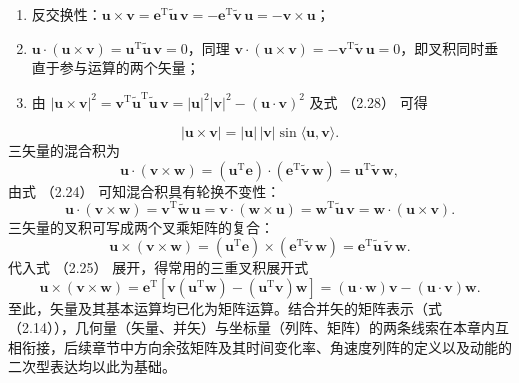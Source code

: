 \begin{enumerate}

\item 反交换性：$\boldsymbol{u}\times\boldsymbol{v} = \boldsymbol{e}^{\mathrm{T}}\tilde{\boldsymbol{u}}\,\boldsymbol{v} = -\boldsymbol{e}^{\mathrm{T}}\tilde{\boldsymbol{v}}\,\boldsymbol{u} = -\boldsymbol{v}\times\boldsymbol{u}$；

\item $\boldsymbol{u}\cdot\left(\boldsymbol{u}\times\boldsymbol{v}\right) = \boldsymbol{u}^{\mathrm{T}}\tilde{\boldsymbol{u}}\,\boldsymbol{v} = 0$，同理 $\boldsymbol{v}\cdot\left(\boldsymbol{u}\times\boldsymbol{v}\right) = -\boldsymbol{v}^{\mathrm{T}}\tilde{\boldsymbol{v}}\,\boldsymbol{u} = 0$，即叉积同时垂直于参与运算的两个矢量；

\item 由 $|\boldsymbol{u}\times\boldsymbol{v}|^2 = \boldsymbol{v}^{\mathrm{T}}\tilde{\boldsymbol{u}}^{\mathrm{T}}\tilde{\boldsymbol{u}}\,\boldsymbol{v} = |\boldsymbol{u}|^2|\boldsymbol{v}|^2 - (\boldsymbol{u}\cdot\boldsymbol{v})^2$ 及式 （2.28） 可得

\end{enumerate}
\[
|\boldsymbol{u}\times\boldsymbol{v}| = |\boldsymbol{u}|\,|\boldsymbol{v}|\sin\langle\boldsymbol{u},\boldsymbol{v}\rangle.
\]
三矢量的混合积为
\[
\boldsymbol{u}\cdot\left(\boldsymbol{v}\times\boldsymbol{w}\right)
= \left(\boldsymbol{u}^{\mathrm{T}}\boldsymbol{e}\right)\cdot\left(\boldsymbol{e}^{\mathrm{T}}\tilde{\boldsymbol{v}}\,\boldsymbol{w}\right)
= \boldsymbol{u}^{\mathrm{T}}\tilde{\boldsymbol{v}}\,\boldsymbol{w},
\]
由式 （2.24） 可知混合积具有轮换不变性：
\[
\boldsymbol{u}\cdot\left(\boldsymbol{v}\times\boldsymbol{w}\right)
= \boldsymbol{v}^{\mathrm{T}}\tilde{\boldsymbol{w}}\,\boldsymbol{u} = \boldsymbol{v}\cdot\left(\boldsymbol{w}\times\boldsymbol{u}\right)
= \boldsymbol{w}^{\mathrm{T}}\tilde{\boldsymbol{u}}\,\boldsymbol{v} = \boldsymbol{w}\cdot\left(\boldsymbol{u}\times\boldsymbol{v}\right).
\]
三矢量的叉积可写成两个叉乘矩阵的复合：
\[
\boldsymbol{u}\times\left(\boldsymbol{v}\times\boldsymbol{w}\right)
= \left(\boldsymbol{u}^{\mathrm{T}}\boldsymbol{e}\right)\times\left(\boldsymbol{e}^{\mathrm{T}}\tilde{\boldsymbol{v}}\,\boldsymbol{w}\right)
= \boldsymbol{e}^{\mathrm{T}}\tilde{\boldsymbol{u}}\,\tilde{\boldsymbol{v}}\,\boldsymbol{w}.
\]
代入式 （2.25） 展开，得常用的三重叉积展开式
\[
\boldsymbol{u}\times\left(\boldsymbol{v}\times\boldsymbol{w}\right)
= \boldsymbol{e}^{\mathrm{T}}\left[\boldsymbol{v}\left(\boldsymbol{u}^{\mathrm{T}}\boldsymbol{w}\right) - \left(\boldsymbol{u}^{\mathrm{T}}\boldsymbol{v}\right)\boldsymbol{w}\right]
= \left(\boldsymbol{u}\cdot\boldsymbol{w}\right)\boldsymbol{v} - \left(\boldsymbol{u}\cdot\boldsymbol{v}\right)\boldsymbol{w}.
\]
至此，矢量及其基本运算均已化为矩阵运算。结合并矢的矩阵表示（式 （2.14）），几何量（矢量、并矢）与坐标量（列阵、矩阵）的两条线索在本章内互相衔接，后续章节中方向余弦矩阵及其时间变化率、角速度列阵的定义以及动能的二次型表达均以此为基础。
